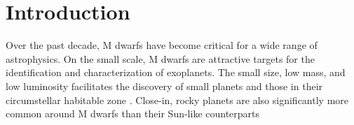 \documentclass[twocolumn]{aastex62}
\begin{document}
\NewPageAfterKeywords




\section{Introduction}\label{sec:intro}
Over the past decade, M dwarfs have become critical for a wide range of astrophysics. On the small scale, M dwarfs are attractive targets for the identification and characterization of exoplanets. The small size, low mass, and low luminosity facilitates the discovery of small planets \citep[e.g.][]{Muirhead2012,Martinez:2017aa,Mann:2018} and those in their circumstellar habitable zone \citep[e.g.,][]{Tarter2007,Shields:2016aa,2017Natur.544..333D}. Close-in, rocky planets are also significantly more common around M dwarfs than their Sun-like counterparts \citep{Dressing2013,2013PNAS..11019273P,Mulders2015,Gaidos2016b}
\end{document}
